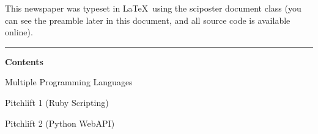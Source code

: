 \documentclass[custom, plainsections]{sciposter}
\begin{document}
\begin{multicols*}{3}
This newspaper was typeset in \LaTeX~using the sciposter document class (you can see the preamble later in this document, and all source code is available online).

\vspace{10pt}
\hrule
\vspace{10pt}

\vspace{5cm}

\textbf{Contents}

Multiple Programming Languages \dotfill \pageref{sec:multiple-languages}

Pitchlift 1 (Ruby Scripting) \dotfill \pageref{sec:pitchlift-1}

Pitchlift 2 (Python WebAPI) \dotfill \pageref{sec:pitchlift-2}

\end{multicols*}

\pagebreak
\end{document}

